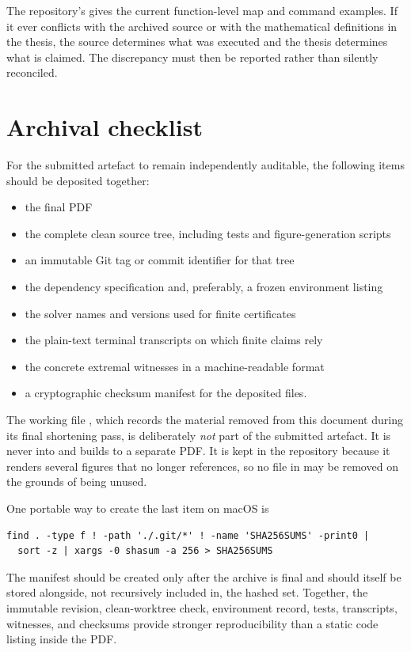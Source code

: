 The repository's  gives the current function-level map and command examples. If it ever conflicts with the archived source or with the mathematical definitions in the thesis, the source determines what was executed and the thesis determines what is claimed. The discrepancy must then be reported rather than silently reconciled.

\section{Archival checklist}\label{app:software-archive}

For the submitted artefact to remain independently auditable, the following items should be deposited together:

\begin{itemize}
  \item the final PDF
  \item the complete clean source tree, including tests and figure-generation scripts
  \item an immutable Git tag or commit identifier for that tree
  \item the dependency specification and, preferably, a frozen environment listing
  \item the solver names and versions used for finite certificates
  \item the plain-text terminal transcripts on which finite claims rely
  \item the concrete extremal witnesses in a machine-readable format
  \item a cryptographic checksum manifest for the deposited files.
\end{itemize}

The working file , which records the material removed from
this document during its final shortening pass, is deliberately \emph{not} part
of the submitted artefact. It is never  into
 and builds to a separate PDF. It is kept in the repository
because it renders several figures that  no longer references,
so no file in  may be removed on the grounds of being unused.

One portable way to create the last item on macOS is

\begin{verbatim}
find . -type f ! -path './.git/*' ! -name 'SHA256SUMS' -print0 |
  sort -z | xargs -0 shasum -a 256 > SHA256SUMS
\end{verbatim}
The manifest should be created only after the archive is final and should itself be stored alongside, not recursively included in, the hashed set. Together, the immutable revision, clean-worktree check, environment record, tests, transcripts, witnesses, and checksums provide stronger reproducibility than a static code listing inside the PDF.
